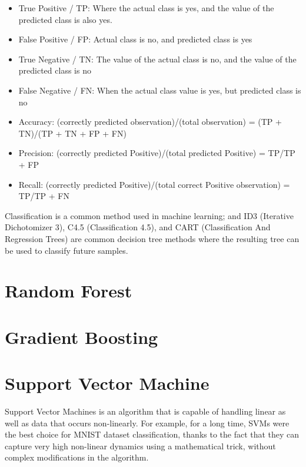 \documentclass[12pt]{article}
\begin{document}
\begin{itemize}

\item{True Positive / TP: Where the actual class is yes, and
the value of the predicted class is also yes.}

\item{False Positive / FP: Actual class is no, and predicted
class is yes}

\item{True Negative / TN: The value of the actual class is no,
and the value of the predicted class is no}

\item{False Negative / FN: When the actual class value is yes,
but predicted class is no}

\item{Accuracy: (correctly predicted observation)/(total
observation) = (TP + TN)/(TP + TN + FP + FN)}

\item{Precision: (correctly predicted Positive)/(total
predicted Positive) = TP/TP + FP}

\item{Recall: (correctly predicted Positive)/(total correct
Positive observation) = TP/TP + FN}

\end{itemize}

Classification is a common method used in machine learning; and
ID3 (Iterative Dichotomizer 3), C4.5 (Classification 4.5), and CART
(Classification And Regression Trees) are common decision tree methods
where the resulting tree can be used to classify future samples.
\newpage
\section{Random Forest}

\newpage
\section{Gradient Boosting}

\newpage
\section{Support Vector Machine}
Support Vector Machines is an algorithm that is capable of handling 
linear as well as data that occurs non-linearly. For example, for a long time, SVMs were the best
choice for MNIST dataset classification, thanks to the fact that they can capture very high
non-linear dynamics using a mathematical trick, without complex modifications in the
algorithm.
\end{document}
